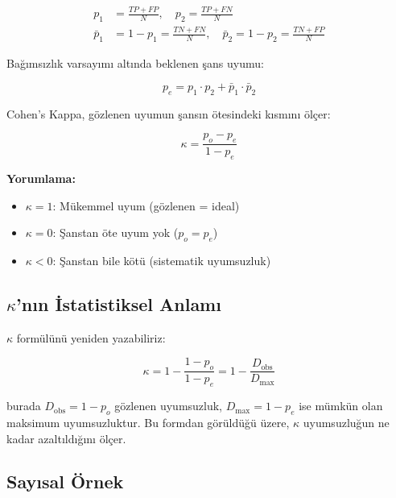 \begin{align}
p_1 &= \frac{TP + FP}{N}, \quad p_2 = \frac{TP + FN}{N} \\[4pt]
\bar{p}_1 &= 1 - p_1 = \frac{TN + FN}{N}, \quad \bar{p}_2 = 1 - p_2 = \frac{TN + FP}{N}
\end{align}

Ba\u{g}{\i}ms{\i}zl{\i}k varsay{\i}m{\i} alt{\i}nda beklenen \c{s}ans uyumu:

\begin{equation}
\label{eq:pe}
p_e = p_1 \cdot p_2 + \bar{p}_1 \cdot \bar{p}_2
\end{equation}

Cohen's Kappa, g\"{o}zlenen uyumun \c{s}ans{\i}n \"{o}tesindeki k{\i}sm{\i}n{\i} \"{o}l\c{c}er:

\begin{equation}
\label{eq:kappa}
\boxed{\kappa = \frac{p_o - p_e}{1 - p_e}}
\end{equation}

\textbf{Yorumlama:}
\begin{itemize}
  \item $\kappa = 1$: M\"{u}kemmel uyum (g\"{o}zlenen = ideal)
  \item $\kappa = 0$: \c{S}anstan \"{o}te uyum yok ($p_o = p_e$)
  \item $\kappa < 0$: \c{S}anstan bile k\"{o}t\"{u} (sistematik uyumsuzluk)
\end{itemize}

\subsection{\texorpdfstring{$\kappa$}{kappa}'n{\i}n \.{I}statistiksel Anlam{\i}}

$\kappa$ form\"{u}l\"{u}n\"{u} yeniden yazabiliriz:

\begin{equation}
\kappa = 1 - \frac{1 - p_o}{1 - p_e} = 1 - \frac{D_{\text{obs}}}{D_{\max}}
\end{equation}

\noindent burada $D_{\text{obs}} = 1 - p_o$ g\"{o}zlenen uyumsuzluk, $D_{\max} = 1 - p_e$ ise m\"{u}mk\"{u}n olan maksimum uyumsuzluktur. Bu formdan g\"{o}r\"{u}ld\"{u}\u{g}\"{u} \"{u}zere, $\kappa$ uyumsuzlu\u{g}un ne kadar azalt{\i}ld{\i}\u{g}{\i}n{\i} \"{o}l\c{c}er.

\subsection{Say{\i}sal \"{O}rnek}

